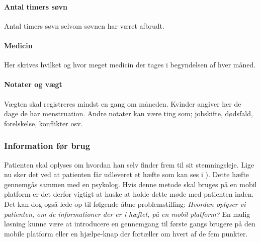 \paragraph{Antal timers søvn}
Antal timers søvn selvom søvnen har været afbrudt.

\paragraph{Medicin}
Her skrives hvilket og hvor meget medicin der tages i begyndelsen af hver måned.

\paragraph{Notater og vægt} 
Vægten skal registreres mindst en gang om måneden.
Kvinder angiver her de dage de har menstruation.
Andre notater kan være ting som; jobskifte, dødsfald, forelskelse, konflikter osv.

\subsubsection{Information før brug}
Patienten skal oplyses om hvordan han selv finder frem til sit stemningsleje.
Lige nu sker det ved at patienten får udleveret et hæfte som kan ses i \citet[Appendiks F, Stemningsregistrering]{faelles}).
Dette hæfte gennemgås sammen med en psykolog.
Hvis denne metode skal bruges på en mobil platform er det derfor vigtigt at huske at holde dette møde med patienten inden.
Det kan dog også lede op til følgende åbne problemstilling: \textit{Hvordan oplyser vi patienten, om de informationer der er i hæftet, på en mobil platform?}
En mulig løsning kunne være at introducere en gennemgang til første gangs brugere på den mobile platform eller en hjælpe-knap der fortæller om hvert af de fem punkter.